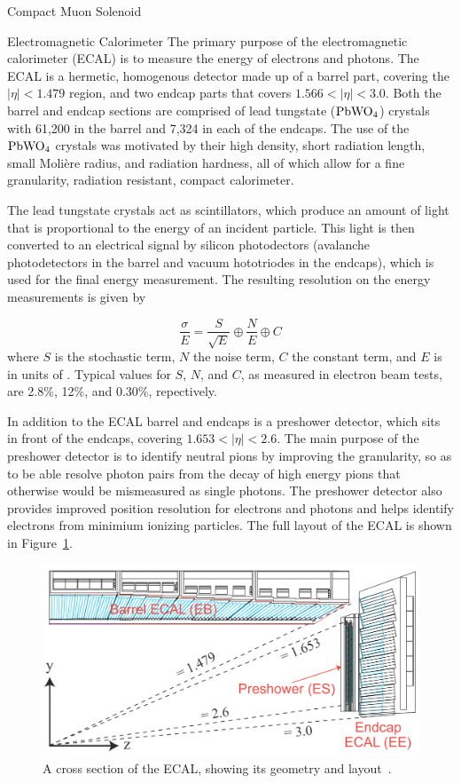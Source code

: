 \begin{section}{Compact Muon Solenoid}
\begin{subsection}{Electromagnetic Calorimeter}
The primary purpose of the electromagnetic calorimeter (ECAL) is to measure the energy of electrons and photons.
The ECAL is a hermetic, homogenous detector made up of a barrel part, covering the $|\eta| < 1.479$ region, and two endcap parts that covers $1.566 < |\eta| < 3.0$.
Both the barrel and endcap sections are comprised of lead tungstate ($\mathrm{PbWO_{4}}$) crystals with 61,200 in the barrel and 7,324 in each of the endcaps.
The use of the $\mathrm{PbWO_{4}}$ crystals was motivated by their high density, short radiation length, small Moli\`ere radius, and radiation hardness, all of which allow for a fine granularity, radiation resistant, compact calorimeter.

The lead tungstate crystals act as scintillators, which produce an amount of light that is proportional to the energy of an incident particle.
This light is then converted to an electrical signal by silicon photodectors (avalanche photodetectors in the barrel and vacuum hototriodes in the endcaps), which is used for the final energy measurement.
The resulting resolution on the energy measurements is given by 

\begin{equation}
\label{eq:ecal_resolution}
\frac{\sigma}{E} = \frac{S}{\sqrt{E}} \oplus \frac{N}{E} \oplus C
\end{equation}
where $S$ is the stochastic term, $N$ the noise term, $C$ the constant term, and $E$ is in units of \GeV.
Typical values for $S$, $N$, and $C$, as measured in electron beam tests, are 2.8\%, 12\%, and 0.30\%, repectively.

In addition to the ECAL barrel and endcaps is a preshower detector, which sits in front of the endcaps, covering $1.653 < |\eta| < 2.6$.
The main purpose of the preshower detector is to identify neutral pions by improving the granularity, so as to be able resolve photon pairs from the decay of high energy pions that otherwise would be mismeasured as single photons. 
The preshower detector also provides improved position resolution for electrons and photons and helps identify electrons from minimium ionizing particles.
The full layout of the ECAL is shown in Figure~\ref{fig:cms_ecal}.

\begin{figure}[tbp!]
\begin{center}
\includegraphics[angle=0,width=0.80\columnwidth]{fig/cms_ecal.png}
\end{center}
\caption{A cross section of the ECAL, showing its geometry and layout~\cite{Isildak:2013kfa}.}
\label{fig:cms_ecal}
\end{figure}


\end{subsection}
\end{section}
